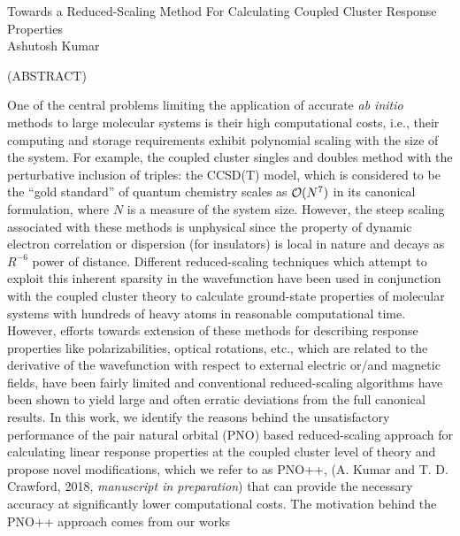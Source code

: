\documentclass[12pt]{report}
\begin{document}
\thispagestyle{empty}
\begin{center}

{\Large
Towards a Reduced-Scaling Method For Calculating Coupled Cluster Response Properties 
}\\

\vspace{8em}
Ashutosh Kumar
\vspace{8em}


(ABSTRACT)


\end{center}
One of the central problems limiting the application of accurate {\em ab
initio} methods to large molecular systems is their high computational costs,
i.e., their computing and storage requirements exhibit polynomial scaling with
the size of the system. For example, the coupled cluster singles and doubles 
method with the perturbative inclusion of triples: the CCSD(T) model, 
which is considered to be the ``gold standard'' of quantum chemistry scales as 
${\cal O}(N^7)$ in its canonical formulation, where $N$ is a measure of the 
system size. However, the steep scaling associated with these methods is 
unphysical since the property of dynamic electron correlation or dispersion 
(for insulators) is local in nature and decays as $R^{-6}$ power of distance. 
Different reduced-scaling techniques which attempt to exploit this inherent 
sparsity in the wavefunction have been used in conjunction with the coupled cluster 
theory to calculate ground-state properties of molecular systems with
hundreds of heavy atoms in reasonable computational time. However, efforts towards
extension of these methods for describing response properties like polarizabilities, optical rotations, 
etc., which are related to the derivative of the wavefunction with respect to external electric or/and magnetic fields,
have been fairly limited and conventional 
reduced-scaling algorithms have been shown to yield large and often erratic deviations from 
the full canonical results. In this work, we identify the reasons behind 
the unsatisfactory performance of the pair natural orbital (PNO) based reduced-scaling 
approach for calculating linear response properties at the coupled cluster level of theory 
and propose novel modifications, which we refer to as PNO++, (A. Kumar and T. D. Crawford, 
2018, {\em manuscript in preparation}) that can provide the necessary accuracy at significantly 
lower computational costs. The motivation behind the PNO++ approach comes from our works 
\end{document}
